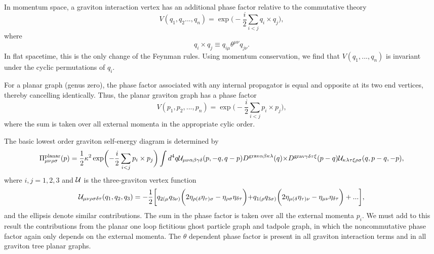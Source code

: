 \documentclass[a4paper,10pt]{article}
\begin{document}
In momentum space, a graviton interaction vertex has an additional phase
factor relative to the commutative
theory~\cite{Filk,Chepelev,Minwalla}
\begin{equation}
V(q_1,q_2...,q_n)=\exp\biggl(-\frac{i}{2}\sum_{i<j}q_i\times q_j\biggr),
\end{equation}
where
\begin{equation}
q_i\times q_j\equiv q_{i\mu}\theta^{\mu\nu}q_{j\nu}.
\end{equation}
In flat spacetime, this is the only change of the Feynman rules.
Using momentum conservation, we find that $V(q_1,...,q_n)$ is invariant
under the cyclic permutations of $q_i$.

For a planar graph (genus zero), the phase factor associated with any
internal propagator is equal and opposite at its two end vertices, thereby
cancelling identically. Thus, the planar graviton graph has a phase factor
\begin{equation}
V(p_1,p_2,...,p_n)=\exp\biggl(-\frac{i}{2}\sum_{i<j}p_i\times p_j\biggr),
\end{equation}
where the sum is taken over all external momenta in the appropriate cylic
order.

The basic lowest order graviton self-energy diagram is determined by
\begin{equation}
\Pi^{\rm planar}_{\mu\nu\rho\sigma}(p)
=\frac{1}{2}\kappa^2\exp\biggl(-\frac{i}{2}\sum_{i<j}p_i\times
p_j\biggr)\int d^4q {\cal U}_{\mu\nu\alpha\beta\gamma\delta}(p,-q,q-p)
D^{{\rm grav}\alpha\beta\kappa\lambda}(q)
$$ $$
\times D^{{\rm grav}\gamma\delta\tau\xi}(p-q){\cal
U}_{\kappa\lambda\tau\xi\rho\sigma}(q,p-q,-p),
\end{equation}
where $i,j=1,2,3$ and ${\cal U}$ is the three-graviton vertex function
\begin{equation}
{\cal U}_{\mu\nu\rho\sigma\delta\tau}(q_1,q_2,q_3) =
-\frac{1}{2}\biggl[q_{2(\mu}q_{3\nu)}\biggl(2\eta_{\rho(\delta}\eta_{\tau)\sigma}
-\eta_{\rho\sigma}\eta_{\delta\tau}\biggr)
$$ $$
+q_{1(\rho}q_{3\sigma)}\biggl(2\eta_{\mu(\delta}\eta_{\tau)\nu}
-\eta_{\mu\nu}\eta_{\delta\tau}\biggr)+...\biggr],
\end{equation}
and the ellipsis denote similar contributions. The sum in the phase factor
is taken over all the external momenta $p_i$. We must add to this result
the contributions from the planar one loop fictitious ghost particle graph
and tadpole graph, in which the noncommutative phase factor
again only depends on the external momenta. The $\theta$ dependent phase
factor is present in all graviton interaction terms and in all graviton
tree planar graphs.
\end{document}
